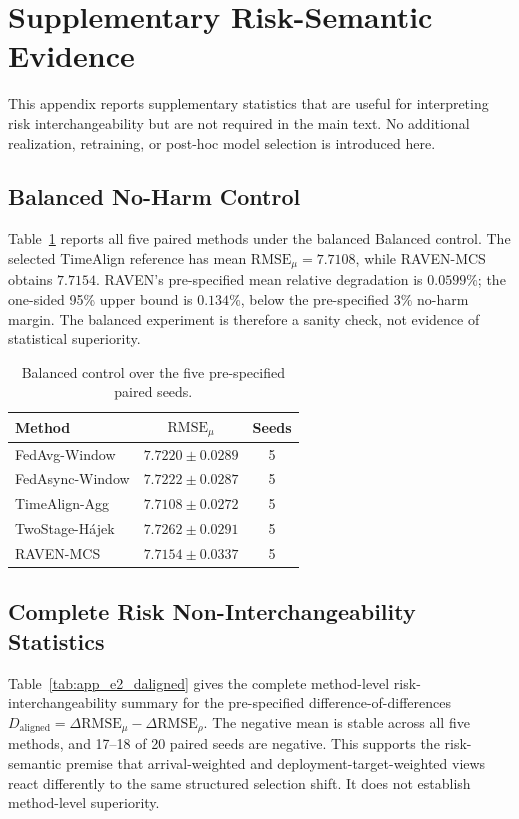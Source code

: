 \section{Supplementary Risk-Semantic Evidence}
\label{app:risk_semantic_evidence}

This appendix reports supplementary statistics that are useful for interpreting
risk interchangeability but are not required in the main text.  No additional realization,
retraining, or post-hoc model selection is introduced here.

\subsection{Balanced No-Harm Control}
\label{app:e1_balanced}

Table~\ref{tab:app_e1_balanced} reports all five paired methods under the balanced
Balanced control.  The selected TimeAlign reference has mean
$\mathrm{RMSE}_\mu=7.7108$, while RAVEN-MCS obtains $7.7154$.  RAVEN's
pre-specified mean relative degradation is $0.0599\%$; the one-sided 95\%
upper bound is $0.134\%$, below the pre-specified $3\%$ no-harm margin.  The
balanced experiment is therefore a sanity check, not evidence of statistical
superiority.

\begin{table}[!t]
\centering
\caption{Balanced control over the five pre-specified paired seeds.}
\label{tab:app_e1_balanced}
\footnotesize
\setlength{\tabcolsep}{5pt}
\begin{tabular*}{\columnwidth}{@{\extracolsep{\fill}}lcc}
\toprule
Method & $\mathrm{RMSE}_\mu$ & Seeds\\
\midrule
FedAvg-Window & $7.7220\pm0.0289$ & 5 \\
FedAsync-Window & $7.7222\pm0.0287$ & 5 \\
TimeAlign-Agg & $7.7108\pm0.0272$ & 5 \\
TwoStage-H\'ajek & $7.7262\pm0.0291$ & 5 \\
RAVEN-MCS & $7.7154\pm0.0337$ & 5 \\
\bottomrule
\end{tabular*}
\end{table}

\subsection{Complete Risk Non-Interchangeability Statistics}
\label{app:e2_full_stats}

Table~\ref{tab:app_e2_daligned} gives the complete method-level risk-interchangeability summary for
the pre-specified difference-of-differences
$D_{\mathrm{aligned}}=\Delta\mathrm{RMSE}_{\mu}
-\Delta\mathrm{RMSE}_{\rho}$.  The negative mean is stable across all five
methods, and 17--18 of 20 paired seeds are negative.  This supports the
risk-semantic premise that arrival-weighted and deployment-target-weighted
views react differently to the same structured selection shift.  It does not
establish method-level superiority.

